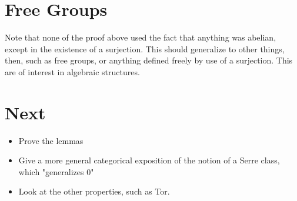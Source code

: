 \documentclass{article}
\newcommand{\0}{\mathbf{0}}
\newcommand{\1}{\mathbf{1}}
\newcommand{\TODO}[1]{\marginpar{\textcolor{blue}{#1}}}
\begin{document}
\section{Free Groups}
Note that none of the proof above used the fact that anything was abelian,\TODO{It just might not be interesting if the groups aren't abelian.} except in the existence of a surjection. This should generalize to other things, then, such as free groups, or anything defined freely by use of a surjection. This are of interest in algebraic structures.

\section{Next}
\begin{itemize}
    \item Prove the lemmas
    \item Give a more general categorical exposition of the notion of a Serre class, which "generalizes 0"
    \item Look at the other properties, such as Tor.
\end{itemize}
\end{document}

